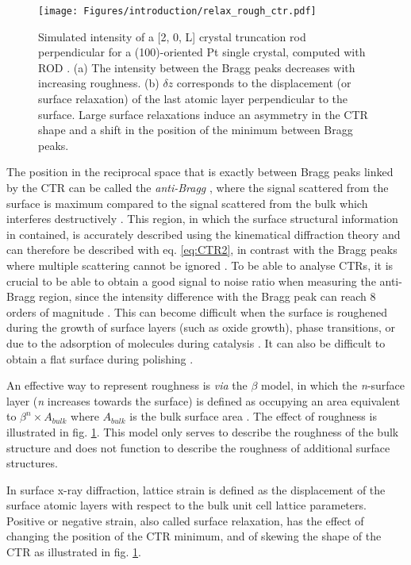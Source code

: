 \begin{figure}[!htb]
    \centering
    \texttt{[image: Figures/introduction/relax\_rough\_ctr.pdf]}
    \caption{
    Simulated intensity of a [2, 0, L] crystal truncation rod perpendicular for a (100)-oriented Pt single crystal, computed with ROD \parencite{Vlieg2000}.
    (a) The intensity between the Bragg peaks decreases with increasing roughness.
    (b) $\delta z$ corresponds to the displacement (or surface relaxation) of the last atomic layer perpendicular to the surface.
    Large surface relaxations induce an asymmetry in the CTR shape and a shift in the position of the minimum between Bragg peaks.
    }
    \label{fig:CTRSimulation}
\end{figure}

The position in the reciprocal space that is exactly between Bragg peaks linked by the CTR can be called the \textit{anti-Bragg} \parencite{Robinson1991}, where the signal scattered from the surface is maximum compared to the signal scattered from the bulk which interferes destructively \parencite{Willmott}.
This region, in which the surface structural information in contained, is accurately described using the kinematical diffraction theory and can therefore be described with eq. \ref{eq:CTR2}, in contrast with the Bragg peaks where multiple scattering cannot be ignored \parencite{Kaganer2007}.
To be able to analyse CTRs, it is crucial to be able to obtain a good signal to noise ratio when measuring the anti-Bragg region, since the intensity difference with the Bragg peak can reach 8 orders of magnitude \parencite{Fadenberger2010}.
This can become difficult when the surface is roughened during the growth of surface layers (such as oxide growth), phase transitions, or due to the adsorption of molecules during catalysis \parencite{Zhdanov1997, Zhdanov1998}.
It can also be difficult to obtain a flat surface during polishing \parencite{Musket1982}.

An effective way to represent roughness is \textit{via} the $\beta$ model, in which the \textit{n}-surface layer (\textit{n} increases towards the surface) is defined as occupying an area equivalent to $\beta^n \times A_{bulk}$ where $A_{bulk}$ is the bulk surface area \parencite{Robinson1986}.
The effect of roughness is illustrated in fig. \ref{fig:CTRSimulation}.
This model only serves to describe the roughness of the bulk structure and does not function to describe the roughness of additional surface structures.

In surface x-ray diffraction, lattice strain is defined as the displacement of the surface atomic layers with respect to the bulk unit cell lattice parameters.
Positive or negative strain, also called surface relaxation,
has the effect of changing the position of the CTR minimum, and of skewing the shape of the CTR as illustrated in fig. \ref{fig:CTRSimulation}.

